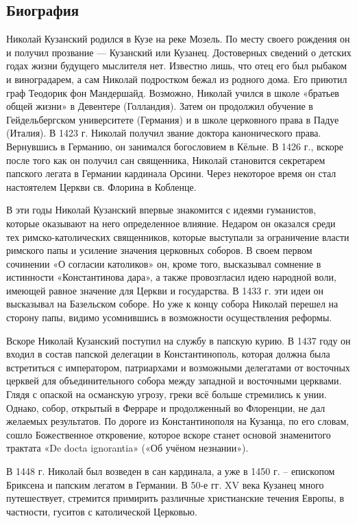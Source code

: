 \documentclass[a4paper, 14pt]{extreport}
\begin{document}
\subsection{Биография}

Николай Кузанский родился в Кузе на реке Мозель. По месту своего
рождения он и получил прозвание --- Кузанский или Кузанец. Достоверных
сведений о детских годах жизни будущего мыслителя нет. Известно лишь,
что отец его был рыбаком и виноградарем, а сам Николай подростком бежал
из родного дома. Его приютил граф Теодорик фон Мандершайд. Возможно,
Николай учился в школе «братьев общей жизни» в Девентере (Голландия).
Затем он продолжил обучение в Гейдельбергском университете (Германия) и
в школе церковного права в Падуе (Италия). В 1423 г. Николай получил
звание доктора канонического права. Вернувшись в Германию, он занимался
богословием в Кёльне. В 1426 г., вскоре после того как он получил сан
священника, Николай становится секретарем папского легата в Германии
кардинала Орсини. Через некоторое время он стал настоятелем Церкви св.
Флорина в Кобленце.

В эти годы Николай Кузанский впервые знакомится с идеями гуманистов,
которые оказывают на него определенное влияние. Недаром он оказался
среди тех римско-католических священников, которые выступали за
ограничение власти римского папы и усиление значения церковных соборов.
В своем первом сочинении «О согласии католиков» он, кроме того,
высказывал сомнение в истинности «Константинова дара», а также
провозгласил идею народной воли, имеющей равное значение для Церкви и
государства. В 1433 г. эти идеи он высказывал на Базельском соборе. Но
уже к концу собора Николай перешел на сторону папы, видимо усомнившись в
возможности осуществления реформы.

Вскоре Николай Кузанский поступил на службу в папскую курию. В 1437 году
он входил в состав папской делегации в Константинополь, которая должна
была встретиться с императором, патриархами и возможными делегатами от
восточных церквей для объединительного собора между западной и
восточными церквами. Глядя с опаской на османскую угрозу, греки всё
больше стремились к унии. Однако, собор, открытый в Ферраре и
продолженный во Флоренции, не дал желаемых результатов. По дороге из
Константинополя на Кузанца, по его словам, сошло Божественное
откровение, которое вскоре станет основой знаменитого трактата «De docta
ignorantia» («Об учёном незнании»).

В 1448 г. Николай был возведен в сан кардинала, а уже в 1450 г. --
епископом Бриксена и папским легатом в Германии. В 50-е гг. XV века
Кузанец много путешествует, стремится примирить различные христианские
течения Европы, в частности, гуситов с католической Церковью.
\end{document}
